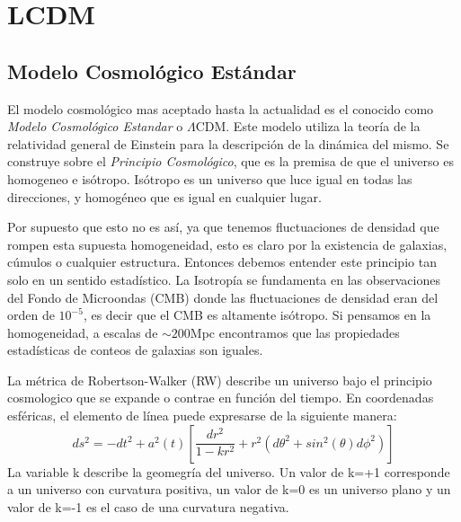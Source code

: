 \chapter{LCDM} %

\label{LCDM} %


\newcommand{\keyword}[1]{\textbf{#1}}
\newcommand{\tabhead}[1]{\textbf{#1}}
\newcommand{\code}[1]{\texttt{#1}}
\newcommand{\file}[1]{\texttt{\bfseries#1}}
\newcommand{\option}[1]{\texttt{\itshape#1}}



\section{Modelo Cosmol\'ogico Est\'andar}
El modelo cosmol\'ogico mas aceptado hasta la actualidad es el conocido como \textit{Modelo Cosmol\'ogico Estandar} o $\Lambda$CDM. Este modelo utiliza la teor\'ia de la relatividad general de Einstein para la descripci\'on de la din\'amica del mismo. Se construye sobre el \textit{Principio Cosmol\'ogico}, que es la premisa de que el universo es homogeneo e is\'otropo.
Is\'otropo es un universo que luce igual en todas las direcciones, y homog\'eneo que es igual en cualquier lugar. 


Por supuesto que esto no es as\'i, ya que tenemos fluctuaciones de densidad que rompen esta supuesta homogeneidad, esto es claro por la existencia de galaxias, c\'umulos o cualquier estructura. Entonces debemos entender este principio tan solo en un sentido estad\'istico. La Isotrop\'ia se fundamenta en las observaciones del Fondo de Microondas (CMB) donde las fluctuaciones de densidad eran del orden de $10^{-5}$, es decir que el CMB es altamente is\'otropo. Si pensamos en la homogeneidad, a escalas de $\sim 200$Mpc encontramos que las propiedades estad\'isticas de conteos de galaxias son iguales. 

La m\'etrica de Robertson-Walker (RW) describe un universo bajo el principio cosmologico que se expande o contrae en funci\'on del tiempo. En coordenadas esf\'ericas, el elemento de l\'inea puede expresarse de la siguiente manera:
\begin{equation}
    ds^{2}=-dt^{2}+a^{2}(t)[\frac{dr^{2}}{1-kr^{2}}+r^{2}(d\theta^{2}+sin^{2}(\theta)d\phi^{2})]
\end{equation}{}
La variable k describe la geomegr\'ia del universo. Un valor de k=+1 corresponde a un universo con curvatura positiva, un valor de k=0 es un universo plano y un valor de k=-1 es el caso de una curvatura negativa. 

